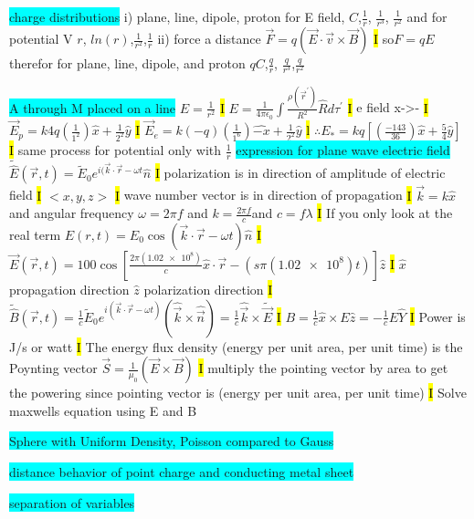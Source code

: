 \documentclass[fontsize=4pt]{scrartcl}
\begin{document}
\colorbox{Cyan}{charge distributions}
i)
plane, line, dipole, proton for E field, $C$,$\frac{1}{r}$, $\frac{1}{r^3}$, $\frac{1}{r^2}$ and for potential V $r$, $ln(r)$,$\frac{1}{r^2}$,$\frac{1}{r}$
ii)
force a distance $\vec{F}=q(\vec{E} \cdot \vec{v} \times \vec{B})$
\hl{I}
so$F=qE$ therefor for plane, line, dipole, and proton $qC$,$\frac{q}{r}$, $\frac{q}{r^3}$,$\frac{q}{r^2}$

\colorbox{Cyan}{A through M placed on a line}
$E=\frac{1}{r^2}$
\hl{I}
$E=\frac{1}{4\pi \epsilon_0} \int \frac{\rho(\vec{r}^{\prime})}{R^2}\hat{R}d\tau^{\prime}$
\hl{I}
e field x->-
\hl{I}
$\vec{E}_p = k4q (\frac{1}{1^2})\hat{x} + \frac{1}{2^2}\hat{y}$
\hl{I}
$\vec{E}_e = k(-q) (\frac{1}{1^6})\hat{-x} + \frac{1}{2^2}\hat{y}$
\hl{l}
$\therefore E_* = kq[(\frac{-143}{36})\hat{x} + \frac{5}{4}\hat{y}] $
\hl{I}
same process for potential only with $\frac{1}{r}$
\colorbox{Cyan}{expression for plane wave electric field}
$\widetilde{\hat{E}}(\vec{r},t)=\widetilde{E}_{0}e^{i(\vec{k}\cdot \vec{r} - \omega t} \hat{n}$
\hl{I}
polarization is in direction of amplitude of electric field
\hl{I}
$<x,y,z>$
\hl{I}
wave number vector is in direction of propagation
\hl{I}
$\vec{k}= k \hat{x}$ and angular frequency $\omega= 2 \pi f$ and  $k = \frac{2\pi f}{c}$and $ c=f\lambda$
\hl{I}
If you only look at the real term $E(r,t)= E_0 \cos (\vec{k} \cdot \vec{r} - \omega t) \hat{n}$
\hl{I}
$\vec{E}(\vec{r},t)=100 \cos [\frac{2\pi (\num{1.02e8})}{c}\hat{x}\cdot \vec{r}-(s\pi(\num{1.02e8})t)]\hat{z} $
\hl{I}
$\hat{x}$ propagation direction $\hat{z}$ polarization direction
\hl{I}
$\widetilde{\hat{B}}(\vec{r},t)=\frac{1}{c}\widetilde{E}_0 e^{i(\vec{k}\cdot \vec{r} - \omega t)}(\hat{\vec{k}}\times \hat{\vec{n}}) = \frac{1}{c}\hat{\vec{k}} \times \widetilde{\vec{E}}$
\hl{I}
$B=\frac{1}{c}\hat{x}\times E\hat{z} = -\frac{1}{c}E\hat{Y}$
\hl{I}
Power is J/s or watt
\hl{I}
The energy flux density (energy per unit area, per unit time) is the Poynting vector $\vec{S} = \frac{1}{\mu_0}(\vec{E} \times \vec{B})$
\hl{I}
multiply the pointing vector by area to get the powering since pointing vector is  (energy per unit area, per unit time)
\hl{I}
Solve maxwells equation using E and B


\colorbox{Cyan}{Sphere with Uniform Density, Poisson compared to Gauss}

\colorbox{Cyan}{distance behavior of point charge and conducting metal sheet}

\colorbox{Cyan}{separation of variables}


























\end{document}
